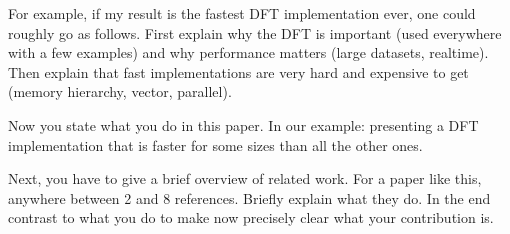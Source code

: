 For example, if my result is the fastest DFT implementation ever, one
could roughly go as follows. First explain why the DFT is important
(used everywhere with a few examples) and why performance matters (large datasets,
realtime). Then explain that fast implementations are very hard and
expensive to get (memory hierarchy, vector, parallel). 

Now you state what you do in this paper. In our example: 
presenting a DFT implementation that is
faster for some sizes than all the other ones.

 Next, you have to give a brief overview of
related work. For a paper like this, anywhere between 2 and 8
references. Briefly explain what they do. In the end contrast to what
you do to make now precisely clear what your contribution is.
